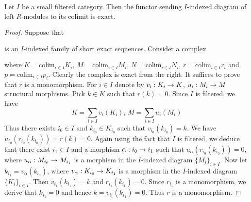 \begin{proposition}\label{proposition:filteredexact}
Let $I$ be a small filtered category. Then the functor sending $I$-indexed diagram of left $R$-modules to its colimit is exact.
\end{proposition}
\begin{proof}
Suppose that 
\begin{center}
\end{center}
is an $I$-indexed family of short exact sequences. Consider a complex
\begin{center}
\end{center}
where $K=\mathrm{colim}_{i\in I}K_i$, $M=\mathrm{colim}_{i\in I}M_i$, $N=\mathrm{colim}_{i\in I}N_i$, $r=\mathrm{colim}_{i\in I}r_i$ and $p=\mathrm{colim}_{i\in I}p_i$. Clearly the complex is exact from the right. It suffices to prove that $r$ is a monomorphism. For $i\in I$ denote by $v_i:K_i\rightarrow K$, $u_i:M_i\rightarrow M$ structural morphisms. Pick $k\in K$ such that $r(k)=0$. Since $I$ is filtered, we have
$$K=\sum_{i\in I}v_i(K_i),\,M=\sum_{i\in I}u_i(M_i)$$
Thus there exists $i_0\in I$ and $k_{i_0}\in K_{i_0}$ such that $v_{i_0}(k_{i_0})=k$. We have $u_{i_0}\left(r_{i_0}(k_{i_0})\right)=r(k)=0$. Again using the fact that $I$ is filtered, we deduce that there exist $i_1\in I$ and a morphism $\alpha:i_0\rightarrow i_1$ such that $u_{\alpha}\left(r_{i_0}(k_{i_0})\right)=0$, where $u_{\alpha}:M_{i_0}\rightarrow M_{i_1}$ is a morphism in the $I$-indexed diagram $\{M_i\}_{i\in I}$. Now let $k_{i_1}=v_{\alpha}(k_{i_0})$, where $v_{\alpha}:K_{i_0}\rightarrow K_{i_1}$ is a morphism in the $I$-indexed diagram $\{K_i\}_{i\in I}$. Then $v_{i_1}(k_{i_1})=k$ and $r_{i_1}(k_{i_1})=0$. Since $r_{i_1}$ is a monomorphism, we derive that $k_{i_1}=0$ and hence $k=v_{i_1}(k_{i_1})=0$. Thus $r$ is a monomorphism.
\end{proof}

